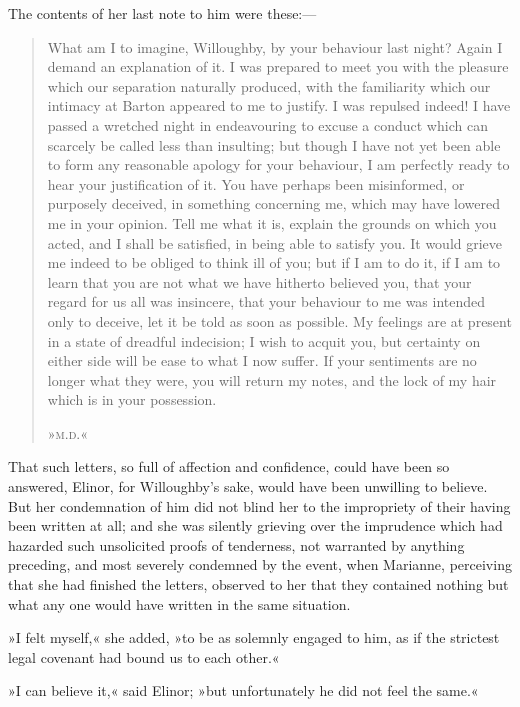 The contents of her last note to him were these:—

\begin{quotation}
\indent What am I to imagine, Willoughby, by your behaviour last night? Again I demand an explanation of it. I was prepared to meet you with the pleasure which our separation naturally produced, with the familiarity which our intimacy at Barton appeared to me to justify. I was repulsed indeed! I have passed a wretched night in endeavouring to excuse a conduct which can scarcely be called less than insulting; but though I have not yet been able to form any reasonable apology for your behaviour, I am perfectly ready to hear your justification of it. You have perhaps been misinformed, or purposely deceived, in something concerning me, which may have lowered me in your opinion. Tell me what it is, explain the grounds on which you acted, and I shall be satisfied, in being able to satisfy you. It would grieve me indeed to be obliged to think ill of you; but if I am to do it, if I am to learn that you are not what we have hitherto believed you, that your regard for us all was insincere, that your behaviour to me was intended only to deceive, let it be told as soon as possible. My feelings are at present in a state of dreadful indecision; I wish to acquit you, but certainty on either side will be ease to what I now suffer. If your sentiments are no longer what they were, you will return my notes, and the lock of my hair which is in your possession.

\begin{flushright}
»\textsc{m.d.}«
\end{flushright}
\end{quotation}

That such letters, so full of affection and confidence, could have been so answered, Elinor, for Willoughby’s sake, would have been unwilling to believe. But her condemnation of him did not blind her to the impropriety of their having been written at all; and she was silently grieving over the imprudence which had hazarded such unsolicited proofs of tenderness, not warranted by anything preceding, and most severely condemned by the event, when Marianne, perceiving that she had finished the letters, observed to her that they contained nothing but what any one would have written in the same situation.

»I felt myself,« she added, »to be as solemnly engaged to him, as if the strictest legal covenant had bound us to each other.«

»I can believe it,« said Elinor; »but unfortunately he did not feel the same.«

